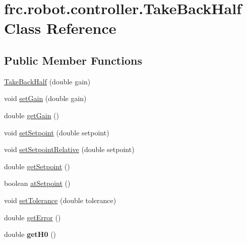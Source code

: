 \hypertarget{classfrc_1_1robot_1_1controller_1_1_take_back_half}{}\section{frc.\+robot.\+controller.\+Take\+Back\+Half Class Reference}
\label{classfrc_1_1robot_1_1controller_1_1_take_back_half}
\subsection*{Public Member Functions}
\begin{DoxyCompactItemize}
\item 
\mbox{\hyperlink{classfrc_1_1robot_1_1controller_1_1_take_back_half_aabeaf60031d2fe81d96d0ad0e8b9ea6d}{Take\+Back\+Half}} (double gain)
\item 
void \mbox{\hyperlink{classfrc_1_1robot_1_1controller_1_1_take_back_half_ac08469c2b2a9dc61cbd197906cd2b4ce}{set\+Gain}} (double gain)
\item 
double \mbox{\hyperlink{classfrc_1_1robot_1_1controller_1_1_take_back_half_acbaafdd8a1c416cab49e222677364a91}{get\+Gain}} ()
\item 
void \mbox{\hyperlink{classfrc_1_1robot_1_1controller_1_1_take_back_half_a171ce016e6e4eb4484c884ee5a0d024a}{set\+Setpoint}} (double setpoint)
\item 
void \mbox{\hyperlink{classfrc_1_1robot_1_1controller_1_1_take_back_half_a9f18ef801fa35f3b5c161795c9ac51ea}{set\+Setpoint\+Relative}} (double setpoint)
\item 
double \mbox{\hyperlink{classfrc_1_1robot_1_1controller_1_1_take_back_half_a3a308ba222599bcd646b6080414dfc73}{get\+Setpoint}} ()
\item 
boolean \mbox{\hyperlink{classfrc_1_1robot_1_1controller_1_1_take_back_half_a5ba31d17fb06ddf4d84654fba7cb71b8}{at\+Setpoint}} ()
\item 
void \mbox{\hyperlink{classfrc_1_1robot_1_1controller_1_1_take_back_half_a87c76e85de87101019b6eaf187dbffe5}{set\+Tolerance}} (double tolerance)
\item 
double \mbox{\hyperlink{classfrc_1_1robot_1_1controller_1_1_take_back_half_a83f8b0c4e447e4d59f84bd8b9e6ac6d6}{get\+Error}} ()
\item 
\mbox{\label{classfrc_1_1robot_1_1controller_1_1_take_back_half_a60d1d6d0fc2892a9c5d519d2279a9346}} 
double {\bfseries get\+H0} ()

\end{DoxyCompactItemize}
